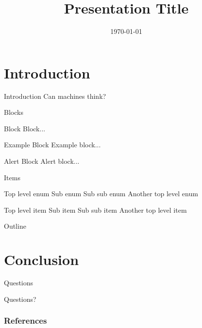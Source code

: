 \documentclass{beamer}
\title[Presentation]{Presentation Title}
\author[Dogan]
{%
  \texorpdfstring{
    \begin{columns}
      \column{.45\linewidth}
      \centering
      Haluk Dogan\\
      \url{https://haluk.github.io/}\\
      \href{mailto:hlk.dogan@gmail.com}{hlk.dogan@gmail.com}
    \end{columns}
}
{Dogan}
}
\institute[UNL] %
{
  Department of Computer Science\\
  University of Nebraska-Lincoln
}
\date[\today] %
{\today}
\begin{document}
\begin{frame}\titlepage
\end{frame}

\section{Introduction}
\begin{frame}{Introduction}
  Can machines think? \citep{turin1950imitation}
\end{frame}

\begin{frame}{Blocks}
  \begin{block}{Block}
    Block...
  \end{block}
  \begin{exampleblock}{Example Block}
    Example block...
  \end{exampleblock}
  \begin{alertblock}{Alert Block}
    Alert block...
  \end{alertblock}
\end{frame}

\begin{frame}{Items}
  \begin{outline}[enumerate]
    \1 Top level enum
    \2 Sub enum
    \3 Sub sub enum
    \1 Another top level enum
  \end{outline}

  \begin{outline}[itemize]
    \1 Top level item
    \2 Sub item
    \3 Sub sub item
    \1 Another top level item
  \end{outline}

\end{frame}

\begin{frame}{Outline}
  \tableofcontents
\end{frame}

\section{Conclusion}
\begin{frame}{Questions}
  \begin{center}
    \Huge{Questions?}
  \end{center}
\end{frame}
\begin{frame}[allowframebreaks]
        \frametitle{References}
        
        
\end{frame}
\end{document}
